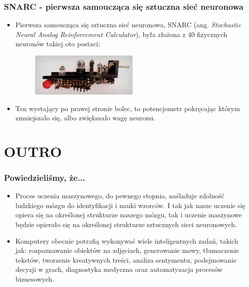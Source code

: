 \documentclass{beamer}
\begin{document}
\begin{frame}[fragile]
\frametitle{SNARC - pierwsza samoucząca się sztuczna sieć neuronowa}
\begin{itemize}
\item Pierwsza samoucząca się sztuczna sieć neuronowa, SNARC (ang. \textit{Stochastic Neural Analog Reinforcement Calculator}), była złożona z 40 fizycznych neuronów takiej oto postaci:

                    \begin{figure}[h]
                        \centering
                        \includegraphics[width=0.5\textwidth]{../../img/the-scientist-foundations-original-the-first-artifical-intelligence-x.png}
                    \end{figure}                    
                    \item Ten wystający po prawej stronie bolec, to potencjometr pokręcając którym zmniejszało się, albo zwiększało wagę neuronu. 
\end{itemize}

\end{frame}

\section{OUTRO}

\begin{frame}[fragile]
\frametitle{Powiedzieliśmy, że...}
 \begin{itemize}
\item Proces uczenia maszynowego, do pewnego stopnia, naśladuje zdolność ludzkiego mózgu do identyfikacji i nauki wzorców. I tak jak nasze uczenie się opiera się na określonej strukturze naszego mózgu, tak i uczenie maszynowe będzie opierało się na określonej strukturze sztucznych sieci neuronowych.
\item Komputery obecnie potrafią wykonywać wiele inteligentnych zadań, takich jak: rozpoznawanie obiektów na zdjęciach, generowanie mowy, tłumaczenie tekstów, tworzenie kreatywnych treści, analiza sentymentu, podejmowanie decyzji w grach, diagnostyka medyczna oraz automatyzacja procesów biznesowych. 
\end{itemize}
\end{frame}
\end{document}
